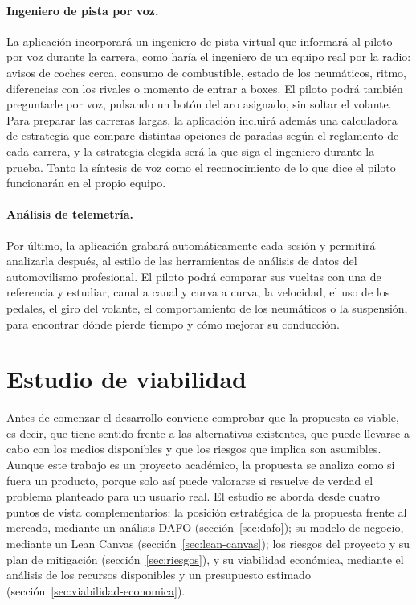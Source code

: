 \paragraph{Ingeniero de pista por voz.}
La aplicación incorporará un ingeniero de pista virtual que informará al piloto por voz durante la carrera, como haría el ingeniero de un equipo real por la radio: avisos de coches cerca, consumo de combustible, estado de los neumáticos, ritmo, diferencias con los rivales o momento de entrar a boxes. El piloto podrá también preguntarle por voz, pulsando un botón del aro asignado, sin soltar el volante. Para preparar las carreras largas, la aplicación incluirá además una calculadora de estrategia que compare distintas opciones de paradas según el reglamento de cada carrera, y la estrategia elegida será la que siga el ingeniero durante la prueba. Tanto la síntesis de voz como el reconocimiento de lo que dice el piloto funcionarán en el propio equipo.

\paragraph{Análisis de telemetría.}
Por último, la aplicación grabará automáticamente cada sesión y permitirá analizarla después, al estilo de las herramientas de análisis de datos del automovilismo profesional. El piloto podrá comparar sus vueltas con una de referencia y estudiar, canal a canal y curva a curva, la velocidad, el uso de los pedales, el giro del volante, el comportamiento de los neumáticos o la suspensión, para encontrar dónde pierde tiempo y cómo mejorar su conducción.

\section{Estudio de viabilidad}
\label{sec:viabilidad}

Antes de comenzar el desarrollo conviene comprobar que la propuesta es viable, es decir, que tiene sentido frente a las alternativas existentes, que puede llevarse a cabo con los medios disponibles y que los riesgos que implica son asumibles. Aunque este trabajo es un proyecto académico, la propuesta se analiza como si fuera un producto, porque solo así puede valorarse si resuelve de verdad el problema planteado para un usuario real. El estudio se aborda desde cuatro puntos de vista complementarios: la posición estratégica de la propuesta frente al mercado, mediante un análisis DAFO (sección~\ref{sec:dafo}); su modelo de negocio, mediante un Lean Canvas (sección~\ref{sec:lean-canvas}); los riesgos del proyecto y su plan de mitigación (sección~\ref{sec:riesgos}), y su viabilidad económica, mediante el análisis de los recursos disponibles y un presupuesto estimado (sección~\ref{sec:viabilidad-economica}).

